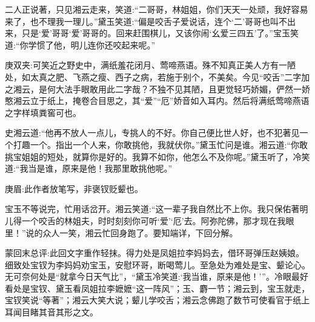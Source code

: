 \begin{parag}
    二人正说著，只见湘云走来，笑道:“二哥哥，林姐姐，你们天天一处顽，我好容易来了，也不理我一理儿。”黛玉笑道:“偏是咬舌子爱说话，连个‘二’哥哥也叫不出来，只是‘爱’哥哥‘爱’哥哥的。回来赶围棋儿，又该你闹‘幺爱三四五’了。”宝玉笑道:“你学惯了他，明儿连你还咬起来呢。”\begin{note}庚双夹:可笑近之野史中，满纸羞花闭月、莺啼燕语。殊不知真正美人方有一陋处，如太真之肥、飞燕之瘦、西子之病，若施于别个，不美矣。今见“咬舌”二字加之湘云，是何大法手眼敢用此二字哉？不独不见其陋，且更觉轻巧娇媚，俨然一娇憨湘云立于纸上，掩卷合目思之，其“爱”“厄”娇音如入耳内。然后将满纸莺啼燕语之字样填粪窖可也。\end{note}史湘云道:“他再不放人一点儿，专挑人的不好。你自己便比世人好，也不犯著见一个打趣一个。指出一个人来，你敢挑他，我就伏你。”黛玉忙问是谁。湘云道:“你敢挑宝姐姐的短处，就算你是好的。我算不如你，他怎么不及你呢。”黛玉听了，冷笑道:“我当是谁，原来是他！我那里敢挑他呢。”\begin{note}庚眉:此作者放笔写，非褒钗贬颦也。\end{note}宝玉不等说完，忙用话岔开。湘云笑道:“这一辈子我自然比不上你。我只保佑著明儿得一个咬舌的林姐夫，时时刻刻你可听‘爱’‘厄’去。阿弥陀佛，那才现在我眼里！”说的众人一笑，湘云忙回身跑了。要知端详，下回分解。
\end{parag}


\begin{parag}
    \begin{note}蒙回末总评:此回文字重作轻抹。得力处是凤姐拉李妈妈去，借环哥弹压赵姨娘。细致处宝钗为李妈妈劝宝玉，安慰环哥，断喝莺儿。至急处为难处是宝、颦论心。无可奈何处是“就拿今日天气比”，“黛玉冷笑道:‘我当谁，原来是他！’”。冷眼最好看处是宝钗、黛玉看凤姐拉李嬷嬷“这一阵风”；玉、麝一节；湘云到，宝玉就走，宝钗笑说“等著”；湘云大笑大说；颦儿学咬舌；湘云念佛跑了数节可使看官于纸上耳闻目睹其音其形之文。\end{note}
\end{parag}